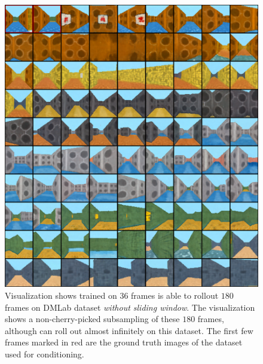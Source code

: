 \begin{figure}[h]
    \centering
    \includegraphics[width=\textwidth]{figures/appendix_vis/df_dmlab_long_1.png}
    \caption{Visualization shows \algo{} trained on $36$ frames is able to rollout $180$ frames on DMLab dataset \emph{without sliding window}. The visualization shows a non-cherry-picked subsampling of these $180$ frames, although \algo{} can roll out almost infinitely on this dataset. The first few frames marked in red are the ground truth images of the dataset used for conditioning.}
    \label{fig:dmlab_long_1}
\end{figure}

